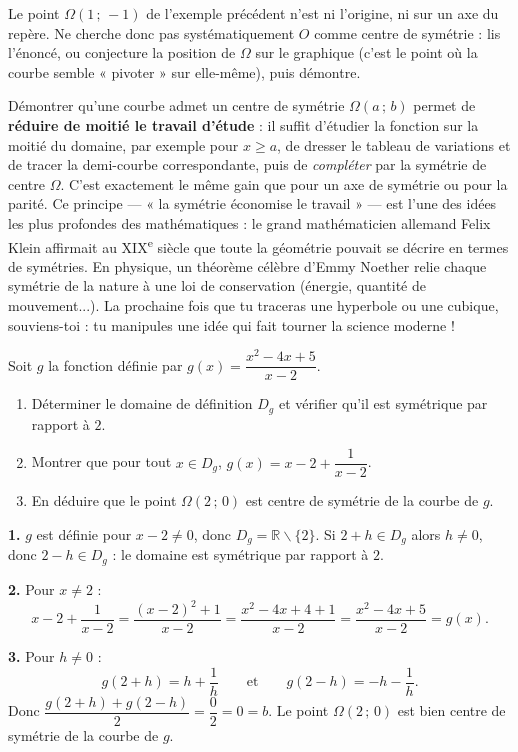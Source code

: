 \documentclass[11pt]{article}
\def\setminus{\mathbin{\backslash}}\let\smallsetminus\setminus
\begin{document}
\begin{attention}
Le point $\Omega(1\,;\,-1)$ de l'exemple précédent n'est ni l'origine, ni sur un axe du repère. Ne cherche donc pas systématiquement $O$ comme centre de symétrie : lis l'énoncé, ou conjecture la position de $\Omega$ sur le graphique (c'est le point où la courbe semble « pivoter » sur elle-même), puis démontre.
\end{attention}

\begin{savaistu}
Démontrer qu'une courbe admet un centre de symétrie $\Omega(a\,;\,b)$ permet de \textbf{réduire de moitié le travail d'étude} : il suffit d'étudier la fonction sur la moitié du domaine, par exemple pour $x \geq a$, de dresser le tableau de variations et de tracer la demi-courbe correspondante, puis de \emph{compléter} par la symétrie de centre $\Omega$. C'est exactement le même gain que pour un axe de symétrie ou pour la parité. Ce principe — « la symétrie économise le travail » — est l'une des idées les plus profondes des mathématiques : le grand mathématicien allemand Felix Klein affirmait au XIX\textsuperscript{e} siècle que toute la géométrie pouvait se décrire en termes de symétries. En physique, un théorème célèbre d'Emmy Noether relie chaque symétrie de la nature à une loi de conservation (énergie, quantité de mouvement...). La prochaine fois que tu traceras une hyperbole ou une cubique, souviens-toi : tu manipules une idée qui fait tourner la science moderne !
\end{savaistu}

\begin{exercice}
Soit $g$ la fonction définie par $g(x) = \dfrac{x^2 - 4x + 5}{x - 2}$.
\begin{enumerate}
\item Déterminer le domaine de définition $D_g$ et vérifier qu'il est symétrique par rapport à $2$.
\item Montrer que pour tout $x \in D_g$, $g(x) = x - 2 + \dfrac{1}{x - 2}$.
\item En déduire que le point $\Omega(2\,;\,0)$ est centre de symétrie de la courbe de $g$.
\end{enumerate}
\end{exercice}

\begin{corrige}
\textbf{1.} $g$ est définie pour $x - 2 \neq 0$, donc $D_g = \mathbb{R} \setminus \{2\}$. Si $2 + h \in D_g$ alors $h \neq 0$, donc $2 - h \in D_g$ : le domaine est symétrique par rapport à $2$.

\textbf{2.} Pour $x \neq 2$ :
\[
x - 2 + \frac{1}{x - 2} = \frac{(x-2)^2 + 1}{x - 2} = \frac{x^2 - 4x + 4 + 1}{x - 2} = \frac{x^2 - 4x + 5}{x - 2} = g(x).
\]

\textbf{3.} Pour $h \neq 0$ :
\[
g(2 + h) = h + \frac{1}{h} \qquad \text{et} \qquad g(2 - h) = -h - \frac{1}{h}.
\]
Donc $\dfrac{g(2+h) + g(2-h)}{2} = \dfrac{0}{2} = 0 = b$. Le point $\Omega(2\,;\,0)$ est bien centre de symétrie de la courbe de $g$.
\end{corrige}
\end{document}
